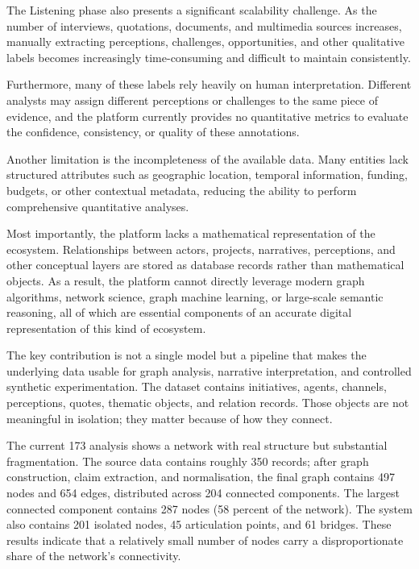 \documentclass[11pt,a4paper]{article}
\begin{document}
The Listening phase also presents a significant scalability challenge.
As the number of interviews, quotations, documents, and multimedia
sources increases, manually extracting perceptions, challenges,
opportunities, and other qualitative labels becomes increasingly
time-consuming and difficult to maintain consistently.

Furthermore, many of these labels rely heavily on human interpretation.
Different analysts may assign different perceptions or challenges to the
same piece of evidence, and the platform currently provides no
quantitative metrics to evaluate the confidence, consistency, or quality
of these annotations.

Another limitation is the incompleteness of the available data. Many
entities lack structured attributes such as geographic location,
temporal information, funding, budgets, or other contextual metadata,
reducing the ability to perform comprehensive quantitative analyses.

Most importantly, the platform lacks a mathematical representation of
the ecosystem. Relationships between actors, projects, narratives,
perceptions, and other conceptual layers are stored as database records
rather than mathematical objects. As a result, the platform cannot
directly leverage modern graph algorithms, network science, graph
machine learning, or large-scale semantic reasoning, all of which are
essential components of an accurate digital representation of this kind
of ecosystem.

The key contribution is not a single model but a pipeline that makes the
underlying data usable for graph analysis, narrative interpretation, and
controlled synthetic experimentation. The dataset contains initiatives,
agents, channels, perceptions, quotes, thematic objects, and relation
records. Those objects are not meaningful in isolation; they matter
because of how they connect.

The current 173 analysis shows a network with real structure but
substantial fragmentation. The source data contains roughly 350 records;
after graph construction, claim extraction, and normalisation, the final
graph contains 497 nodes and 654 edges, distributed across 204
connected components. The largest connected component contains 287
nodes (58 percent of the network). The system also contains 201
isolated nodes, 45 articulation points, and 61 bridges. These results
indicate that a relatively small number of nodes carry a
disproportionate share of the network's connectivity.
\end{document}
